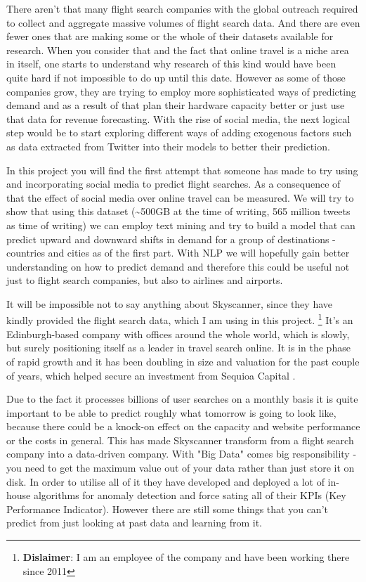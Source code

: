 \documentclass[minf,frontabs,twoside,singlespacing,parskip]{infthesis}
\begin{document}
There aren't that many flight search companies with the global outreach required to collect and aggregate massive volumes of flight search data. And there are even fewer ones that are making some or the whole of their datasets available for research. When you consider that and the fact that online travel is a niche area in itself, one starts to understand why research of this kind would have been quite hard if not impossible to do up until this date. However as some of those companies grow, they are trying to employ more sophisticated ways of predicting demand and as a result of that plan their hardware capacity better or just use that data for revenue forecasting. With the rise of social media, the next logical step would be to start exploring different ways of adding exogenous factors such as data extracted from Twitter into their models to better their prediction. 


In this project you will find the first attempt that someone has made to try using and incorporating social media to predict flight searches. As a consequence of that the effect of social media over online travel can be measured. We will try to show that using this dataset (\textasciitilde 500GB at the time of writing, 565 million tweets as time of writing) we can employ text mining and try to build a model that can predict upward and downward shifts in demand for a group of destinations - countries and cities as of the first part. With NLP we will hopefully gain better understanding on how to predict demand and therefore this could be useful not just to flight search companies, but also to airlines and airports. 


It will be impossible not to say anything about Skyscanner, since they have kindly provided the flight search data, which I am using in this project. \footnote{\textbf{Dislaimer}: I am an employee of the company and have been working there since 2011} It's an Edinburgh-based company with offices around the whole world, which is slowly, but surely positioning itself as a leader in travel search online. It is in the phase of rapid growth and it has been doubling in size and valuation for the past couple of years, which helped secure an investment from Sequioa Capital \cite{seqcap}.  

Due to the fact it processes billions of user searches on a monthly basis it is quite important to be able to predict roughly what tomorrow is going to look like, because there could be a knock-on effect on the capacity and website performance or the costs in general. This has made Skyscanner transform from a flight search company into a data-driven company. With "Big Data" comes big responsibility - you need to get the maximum value out of your data rather than just store it on disk. In order to utilise all of it they have developed and deployed a lot of in-house algorithms for anomaly detection and force sating all of their KPIs (Key Performance Indicator). However there are still some things that you can't predict from just looking at past data and learning from it.
\end{document}
